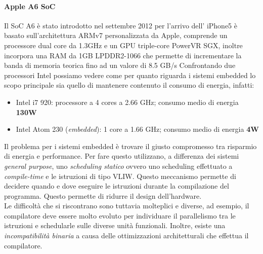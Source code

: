 \paragraph{Apple A6 SoC}
Il SoC A6 è stato introdotto nel settembre 2012 per l'arrivo dell' iPhone5 è basato sull'architettura ARMv7 personalizzata da Apple, comprende un processore dual core da 1.3GHz e un GPU triple-core PowerVR SGX, inoltre incorpora una RAM da 1GB LPDDR2-1066 che permette di incrementare la banda di memoria teorica fino ad un valore di 8.5 GB/s
Confrontando due processori Intel possiamo vedere come per quanto riguarda i sistemi embedded lo scopo principale sia quello di mantenere contenuto il consumo di energia, infatti:
\begin{itemize}
\item Intel i7 920: processore a 4 cores a 2.66 GHz; consumo medio di energia \textbf{130W}
\item Intel Atom 230 (\emph{embedded}): 1 core a 1.66 GHz; consumo medio di energia \textbf{4W}
\end{itemize}
Il problema per i sistemi embedded è trovare il giusto compromesso tra risparmio di energia e performance. Per fare questo utilizzano, a differenza dei sistemi \emph{general purpose}, uno \emph{scheduling statico} ovvero uno scheduling effettuato a \emph{compile-time} e le istruzioni di tipo VLIW. Questo meccanismo permette di decidere quando e dove eseguire le istruzioni durante la compilazione del programma. Questo permette di ridurre il design dell'hardware.\\
Le difficoltà che si riscontrano sono tuttavia molteplici e diverse, ad esempio, il compilatore deve essere molto evoluto per individuare il parallelismo tra le istruzioni e schedularle sulle diverse unità funzionali. Inoltre, esiste una \emph{incompatibilità binaria} a causa delle ottimizzazioni architetturali che effettua il compilatore.
